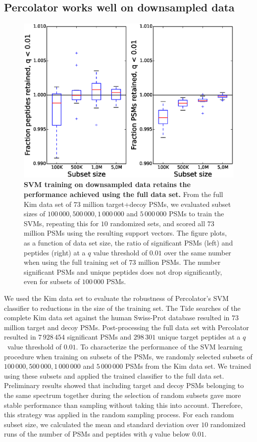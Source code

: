 \documentclass{article}
\begin{document}
\subsection*{Percolator works well on downsampled data}

\begin{figure}
\begin{center}
\includegraphics[width=0.6\linewidth]{./img/subset-performance}
\caption{\label{fig:subset}\textbf{SVM training on downsampled data
    retains the performance achieved using the full data set.}  From
  the full Kim data set of $73$ million target+decoy PSMs, we
  evaluated subset sizes of $100\,000, 500\,000, 1\,000\,000$ and
  $5\,000\,000$ PSMs to train the SVMs, repeating this for $10$
  randomized sets, and scored all $73$ million PSMs using the
  resulting support vectors. The figure plots, as a function of data
  set size, the ratio of significant PSMs (left) and peptides (right)
  at a $q$ value threshold of $0.01$ over the same number when using
  the full training set of $73$ million PSMs. The number significant
  PSMs and unique peptides does not drop significantly, even for
  subsets of $100\,000$ PSMs.}
\end{center}
\end{figure}

We used the Kim data set to evaluate the robustness of Percolator's
SVM classifier to reductions in the size of the training set.  The
Tide searches of the complete Kim data set against the human
Swiss-Prot database resulted in $73$ million target and decoy PSMs.
Post-processing the full data set with Percolator resulted in
$7\,928\,454$ significant PSMs and $298\,301$ unique target peptides
at a $q$~value threshold of $0.01$.  To characterize the performance
of the SVM learning procedure when training on subsets of the PSMs, we
randomly selected subsets of $100\,000, 500\,000, 1\,000\,000$ and
$5\,000\,000$ PSMs from the Kim data set.  We trained using these
subsets and applied the trained classifier to the full data
set. Preliminary results showed that including target and decoy PSMs
belonging to the same spectrum together during the selection of random
subsets gave more stable performance than sampling without taking this
into account. Therefore, this strategy was applied in the random
sampling process. For each random subset size, we calculated the mean
and standard deviation over $10$ randomized runs of the number of PSMs
and peptides with $q$ value below $0.01$.
\end{document}
